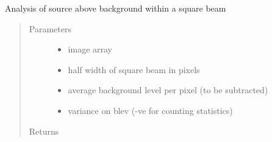 \documentclass[letterpaper,10pt,english]{sphinxmanual}
\begin{document}

\begin{fulllineitems}
\label{\detokenize{images_functions:images.sqbeam}}
Analysis of source above background within a square beam
\begin{quote}\begin{description}
\item[{Parameters}] \leavevmode\begin{itemize}
\item {} 
 \textendash{} image array

\item {} 
 \textendash{} half width of square beam in pixels

\item {} 
 \textendash{} average background level per pixel (to be subtracted)

\item {} 
 \textendash{} variance on blev (-ve for counting statistics)

\end{itemize}

\item[{Returns}] \leavevmode


\end{description}
\end{quote}
\end{fulllineitems}
\end{document}
